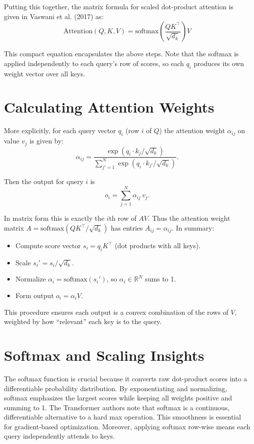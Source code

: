\documentclass[11pt,a4paper]{article}
\begin{document}
Putting this together, the matrix formula for scaled dot-product attention is given in Vaswani et al. (2017) as:
$$\boxed{\text{Attention}(Q,K,V) = \text{softmax}\left(\frac{QK^\top}{\sqrt{d_k}}\right)V}$$

This compact equation encapsulates the above steps. Note that the softmax is applied independently to each query's row of scores, so each $q_i$ produces its own weight vector over all keys.

\section{Calculating Attention Weights}

More explicitly, for each query vector $q_i$ (row $i$ of $Q$) the attention weight $\alpha_{ij}$ on value $v_j$ is given by:
$$\alpha_{ij} = \frac{\exp\left(q_i\cdot k_j/\sqrt{d_k}\right)}{\sum_{j'=1}^N \exp\left(q_i\cdot k_{j'}/\sqrt{d_k}\right)}.$$

Then the output for query $i$ is 
$$o_i = \sum_{j=1}^N \alpha_{ij}\,v_j.$$ 

In matrix form this is exactly the $i$th row of $AV$. Thus the attention weight matrix $A=\text{softmax}(QK^\top/\sqrt{d_k})$ has entries $A_{ij}=\alpha_{ij}$. In summary:

\begin{itemize}
\item Compute score vector $s_i = q_i K^\top$ (dot products with all keys).
\item Scale $s_i' = s_i/\sqrt{d_k}$.
\item Normalize $\alpha_i = \text{softmax}(s_i')$, so $\alpha_i\in\mathbb{R}^N$ sums to 1.
\item Form output $o_i = \alpha_i V$.
\end{itemize}

This procedure ensures each output is a convex combination of the rows of $V$, weighted by how ``relevant'' each key is to the query.

\section{Softmax and Scaling Insights}

The softmax function is crucial because it converts raw dot-product scores into a differentiable probability distribution. By exponentiating and normalizing, softmax emphasizes the largest scores while keeping all weights positive and summing to 1. The Transformer authors note that softmax is a continuous, differentiable alternative to a hard max operation. This smoothness is essential for gradient-based optimization. Moreover, applying softmax row-wise means each query independently attends to keys.
\end{document}
